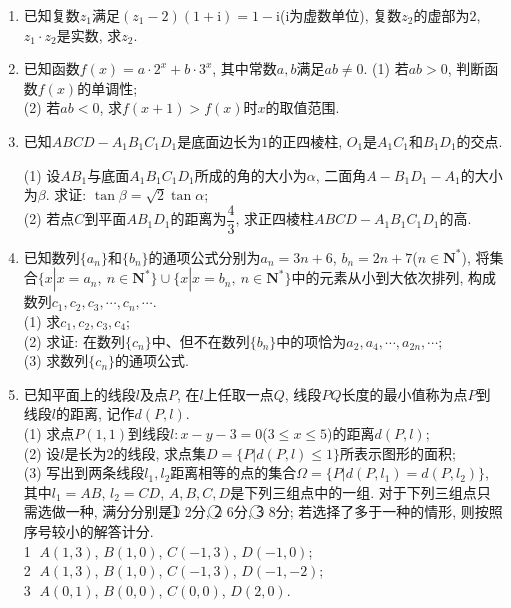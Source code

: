 \documentclass[10pt,a4paper]{article}
\begin{document}
\begin{enumerate}[1.]
\item 已知复数$z_1$满足$(z_1-2)(1+\mathrm{i})=1-\mathrm{i}$($\mathrm{i}$为虚数单位), 复数$z_2$的虚部为$2$, $z_1\cdot z_2$是实数, 求$z_2$.
\item 已知函数$f(x)=a\cdot 2^x+b\cdot 3^x$, 其中常数$a,b$满足$ab\ne 0$.
(1) 若$ab>0$, 判断函数$f(x)$的单调性;\\
(2) 若$ab<0$, 求$f(x+1)>f(x)$时$x$的取值范围.
\item 已知$ABCD-A_1B_1C_1D_1$是底面边长为$1$的正四棱柱, $O_1$是$A_1C_1$和$B_1D_1$的交点.
\begin{center}
\end{center}
(1) 设$AB_1$与底面$A_1B_1C_1D_1$所成的角的大小为$\alpha$, 二面角$A-B_1D_1-A_1$的大小为$\beta$. 求证: $\tan \beta =\sqrt 2\tan \alpha$;\\
(2) 若点$C$到平面$AB_1D_1$的距离为$\dfrac 43$, 求正四棱柱$ABCD-A_1B_1C_1D_1$的高.
\item 已知数列$\{a_n\}$和$\{b_n\}$的通项公式分别为$a_n=3n+6$, $b_n=2n+7$($n\in \mathbf{N}^*$), 将集合$\{x|x=a_n,\ n\in \mathbf{N}^*\}\cup \{x|x=b_n,\ n\in \mathbf{N}^*\}$中的元素从小到大依次排列, 构成数列$c_1,c_2,c_3,\cdots ,c_n,\cdots$.\\
(1) 求$c_1,c_2,c_3,c_4$;\\
(2) 求证: 在数列$\{c_n\}$中、但不在数列$\{b_n\}$中的项恰为$a_2,a_4,\cdots ,a_{2n},\cdots$;\\
(3) 求数列$\{c_n\}$的通项公式.
\item 已知平面上的线段$l$及点$P$, 在$l$上任取一点$Q$, 线段$PQ$长度的最小值称为点$P$到线段$l$的距离, 记作$d(P,l)$.\\
(1) 求点$P(1,1)$到线段$l:x-y-3=0$($3\le x\le 5$)的距离$d(P,l)$;\\
(2) 设$l$是长为$2$的线段, 求点集$D=\{P|d(P,l)\le 1\}$所表示图形的面积;\\
(3) 写出到两条线段$l_1,l_2$距离相等的点的集合$\Omega =\{P|d(P,l_1)=d(P,l_2)\}$, 其中$l_1=AB$, $l_2=CD$, $A,B,C,D$是下列三组点中的一组. 对于下列三组点只需选做一种, 满分分别是\textcircled{1} 2分, \textcircled{2} 6分, \textcircled{3} 8分; 若选择了多于一种的情形, 则按照序号较小的解答计分.\\
\textcircled{1}  $A(1,3)$, $B(1,0)$, $C(-1,3)$, $D(-1,0)$;\\
\textcircled{2}  $A(1,3)$, $B(1,0)$, $C(-1,3)$, $D(-1,-2)$;\\
\textcircled{3}  $A(0,1)$, $B(0,0)$, $C(0,0)$, $D(2,0)$.


\end{enumerate}
\end{document}
